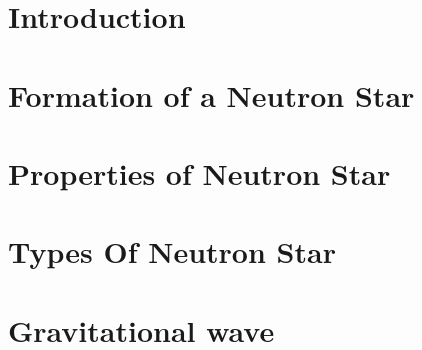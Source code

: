 \documentclass[12pt]{article}
\begin{document}
\newpage



\newpage

\section{Introduction}


\newpage

\section{Formation of a Neutron Star}



\newpage
\section{Properties of Neutron Star}



\newpage

\section{Types Of Neutron Star}



\newpage
\section{Gravitational wave}







\newpage
\printbibliography
\end{document}
